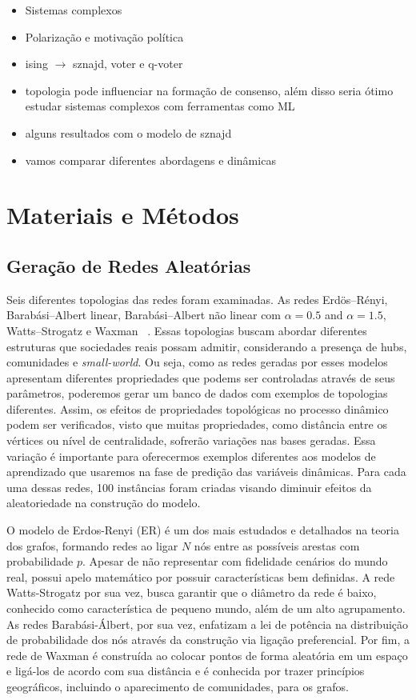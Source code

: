 \documentclass{article}
\begin{document}
\begin{itemize}
    \item Sistemas complexos
    \item Polarização e motivação política
    \item ising $\rightarrow$ sznajd, voter e q-voter
    \item topologia pode influenciar na formação de consenso, além disso seria ótimo estudar sistemas complexos com ferramentas como ML
    \item alguns resultados com o modelo de sznajd
    \item vamos comparar diferentes abordagens e dinâmicas
\end{itemize}

\section{Materiais e Métodos}
\subsection{Geração de Redes Aleatórias}
Seis diferentes topologias das redes foram examinadas. As redes Erdös–Rényi, Barabási–Albert linear, Barabási–Albert não linear com $\alpha=0.5$ and $\alpha=1.5$, Watts–Strogatz e Waxman ~\cite{boccaletti2006complex,costa2007characterization}. Essas topologias buscam abordar diferentes estruturas que sociedades reais possam admitir, considerando a presença de hubs, comunidades e \textit{small-world}. Ou seja, como as redes geradas por esses modelos apresentam diferentes propriedades que podems ser controladas através de seus parâmetros, poderemos gerar um banco de dados com exemplos de topologias diferentes. Assim, os efeitos de propriedades topológicas no processo dinâmico podem ser verificados, visto que muitas propriedades, como distância entre os vértices ou nível de centralidade, sofrerão variações nas bases geradas. Essa variação é importante para oferecermos exemplos diferentes aos modelos de aprendizado que usaremos na fase de predição das variáveis dinâmicas. Para cada uma dessas redes, 100 instâncias foram criadas visando diminuir efeitos da aleatoriedade na construção do modelo.

O modelo de Erdos-Renyi (ER) é um dos mais estudados e detalhados na teoria dos grafos, formando redes ao ligar $N$ nós entre as possíveis arestas com probabilidade $p$. Apesar de não representar com fidelidade cenários do mundo real, possui apelo matemático por possuir características bem definidas. A rede Watts-Strogatz por sua vez, busca garantir que o diâmetro da rede é baixo, conhecido como característica de pequeno mundo, além de um alto agrupamento. As redes Barabási-Álbert, por sua vez, enfatizam a lei de potência na distribuição de probabilidade dos nós através da construção via ligação preferencial. Por fim, a rede de Waxman é construída ao colocar pontos de forma aleatória em um espaço e ligá-los de acordo com sua distância e é conhecida por trazer princípios geográficos, incluindo o aparecimento de comunidades, para os grafos.
\end{document}
